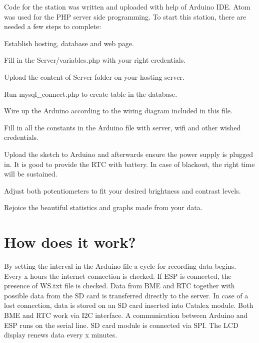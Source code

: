 Code for the station was written and uploaded with help of Arduino I\+DE. Atom was used for the P\+HP server side programming. To start this station, there are needed a few steps to complete\+:
\begin{DoxyEnumerate}
\item Establish hosting, database and web page.
\item Fill in the Server/variables.\+php with your right credentials.
\item Upload the content of Server folder on your hosting server.
\item Run mysql\+\_\+connect.\+php to create table in the database.
\item Wire up the Arduino according to the wiring diagram included in this file.
\item Fill in all the constants in the Arduino file with server, wifi and other wished credentials.
\item Upload the sketch to Arduino and afterwards ensure the power supply is plugged in. It is good to provide the R\+TC with battery. In case of blackout, the right time will be sustained.
\item Adjust both potentiometers to fit your desired brightness and contrast levels.
\item Rejoice the beautiful statistics and graphs made from your data.
\end{DoxyEnumerate}

\section*{How does it work?}

By setting the interval in the Arduino file a cycle for recording data begins. Every x hours the internet connection is checked. If E\+SP is connected, the presence of W\+S.\+txt file is checked. Data from B\+ME and R\+TC together with possible data from the SD card is transferred directly to the server. In case of a lost connection, data is stored on an SD card inserted into Catalex module. Both B\+ME and R\+TC work via I2C interface. A communication between Arduino and E\+SP runs on the serial line. SD card module is connected via S\+PI. The L\+CD display renews data every x minutes. 